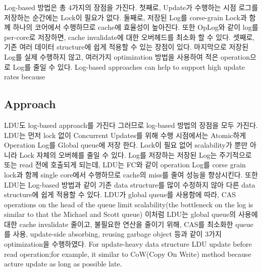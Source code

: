 \fi


%
\ifkor
Log-based 방법은 총 4가지의 장점을 가진다. 첫째로, Update가 수행하는 시점 로그를 저장하는 순간에는 Lock이 필요가 없다. 
둘째로, 저장된 Log를 corse-grain Lock과 함께 하나의 코어에서 수행하므로 cache에 효율성이 높아진다. 
또한 OpLog와 같이 log를 per-core로 저장하면, cache invalidate에 대한 오버헤드를 최소화 할 수 있다. 
셋째로, 기존 여러 데이터 structure에 쉽게 적용할 수 있는 장점이 있다.
마지막으로 저장된 Log를 실제 수행하지 않고, 여러가지 optimization 방법을 사용하여 적은 operation으로 Log를 줄일 수
있다.
\else
Log-based approaches can help to support high update rates because
\fi



\subsection{Approach}


\ifkor
LDU도 log-based approach를 가진다 그러므로 log-based 방법의 장점을 모두 가진다.
LDU는 먼저 lock 없이 Concurrent Updates를 위해 수행 시점에서는 Atomic하게 Operation  Log를 Global
queue에 저장 한다. Lock이 필요 없어 scalability가 뿐만 아니라  Lock 자체의 오버헤를 줄일 수 있다. 
Log를 저장하는 저장된 Log는 주기적으로 또는 read 전에 호출되게 되는데, LDU는 FC와 같이 operation Log를 corse
grain lock과 함께 single core에서 수행하므로 cache의 miss를 줄여 성능을 향상시킨다.
또한 LDU는 Log-based 방법과 같이 기존 data structure를 많이 수정하지 않아 다른 data structure에 쉽게 적용할
수 있다.
LDU가 global queue를 사용함에 따라, CAS operations on the head of the queue limit
scalability(the bottleneck on the log is similar to that the Michael and Scott
queue) 
이처럼 LDU는 global queue의 사용에 대한 cache invalidate 줄이고, 불필요한 연산을 줄이기 위해, CAS를 최소화한
queue를 사용, update-side absorbing, reusing garbage object 등과 같이 3가지 optimization을
수행하였다.
\else
For update-heavy data structure LDU update before read operation;for example, it
similar to CoW(Copy On Write) method because acture update as long as possible
late.
\fi





